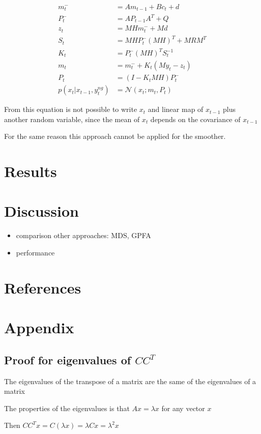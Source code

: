 \documentclass{article}
\begin{document}
\begin{equation}\label{filter_combined}
\begin{split}
    m_t^- &= Am_{t-1} + B c_t + d\\
    P_t^- &= AP_{t-1}A^T + Q\\
    z_t &= MHm_t^- + Md\\
    S_t &= MHP_t^-(MH)^T + MRM^T\\
    K_t &= P_t^-(MH)^TS_t^{-1}\\
    m_t &= m_t^- + K_t(My_t - z_t)\\
    P_t &= (I-K_tMH)P_t^-\\
    p(x_t|x_{t-1}, y^{ng}_t) &= \mathcal{N}(x_t; m_t, P_t)
\end{split}
\end{equation}

From this equation is not possible to write $x_t$ and linear map of $x_{t-1}$ plus another random variable, since the mean of $x_t$ depends on the covariance of $x_{t-1}$ 
    
For the same reason this approach cannot be applied for the smoother.

\section{Results}

\section{Discussion}

\begin{itemize}
    \item comparison other approaches: MDS, GPFA
    \item performance
\end{itemize}

\section*{References}

\printbibliography

\section*{Appendix}

\subsection{Proof for eigenvalues of $CC^T$}

The eigenvalues of the transpose of a matrix are the same of the eigenvalues of a matrix

The properties of the eigenvalues is that $Ax=\lambda x$ for any vector $x$

Then $CC^Tx=C(\lambda x) = \lambda Cx = \lambda^2 x$
\end{document}
